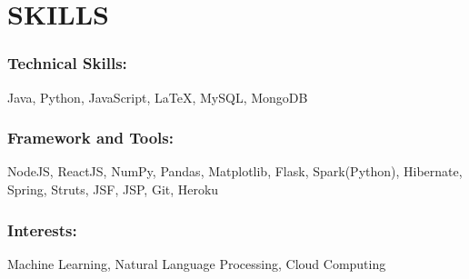 \documentclass[a4paper,11pt]{article}
\begin{document}
\section{SKILLS}
\subsubsection{Technical Skills: }\hspace{0.4em}Java, Python, JavaScript, {\LaTeX}, MySQL, MongoDB
\subsubsection{Framework and Tools: }\hspace{0.4em}NodeJS, ReactJS, NumPy, Pandas, Matplotlib, Flask, Spark(Python), Hibernate, Spring, Struts, JSF, JSP, Git, Heroku
\subsubsection{Interests: }\hspace{0.4em}Machine Learning, Natural Language Processing, Cloud Computing

\end{document}
